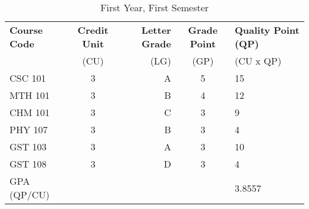 \documentclass{article}
\begin{document}
	\begin{table}[h!]
		\begin{center}
			\caption{First Year, First Semester}
			\label{tab:table1}
			\begin{tabular}{l|c|r|c|l}
				\textbf{Course Code} & \textbf{Credit Unit} &
				\textbf{Letter  Grade} & \textbf{Grade Point} &
				\textbf{Quality Point (QP)}\\
				 & (CU) & (LG) & (GP) & (CU x QP) \\
				\hline
				CSC 101 & 3 & A & 5 & 15\\
				MTH 101 & 3 & B & 4 & 12\\
				CHM 101 & 3 & C & 3 & 9\\
				PHY 107 & 3 & B & 3 & 4\\
				GST 103 & 3 & A & 3 & 10\\
				GST 108 & 3 & D & 3 & 4\\
				GPA (QP/CU)&  &  &  & 3.8557\\
			\end{tabular}
		\end{center}
	\end{table}
\end{document}

